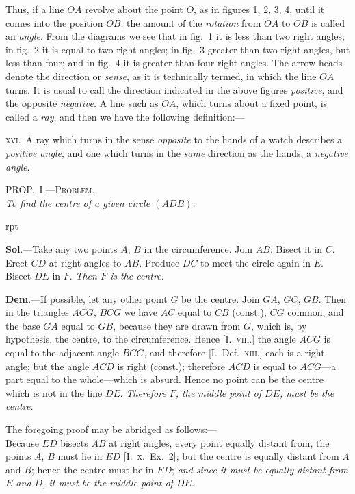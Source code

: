 \documentclass[oneside]{book}
\newcounter{wrapwidth}
\newcommand\myprop[2]{
\bigskip\Needspace*{4\baselineskip}\begin{center}\textsc{#1}\\\medskip\emph{#2}\par\end{center}
}
\newcommand\imgflow[3]{
\setcounter{wrapwidth}{#1}

\begin{wrapfigure}[#2]{r}{\value{wrapwidth}pt}
\begin{center}
\vspace{-0.3in}

\end{center}
\end{wrapfigure}
}
\newcommand\imgcent[2]{
\begin{center}

\end{center}
}
\begin{document}
\imgcent{308}{f103}

Thus, if a line $OA$ revolve about the point $O$, as in
figures 1, 2, 3, 4, until it comes into the position $OB$,
the amount of the \emph{rotation} from $OA$ to $OB$ is called an
\emph{angle}. From the diagrams we see that in fig.~1 it is
less than two right angles; in fig.~2 it is equal to two
right angles; in fig.~3 greater than two right angles,
but less than four; and in fig.~4 it is greater than four
right angles. The arrow-heads denote the direction or
\emph{sense}, as it is technically termed, in which the line $OA$
turns. It is usual to call the direction indicated in the
above figures \emph{positive}, and the opposite \emph{negative.} A line
such as $OA$, which turns about a fixed point, is called
a \emph{ray}, and then we have the following definition:---

\textsc{xvi}.\ A ray which turns in the sense \emph{opposite} to the
hands of a watch describes a \emph{positive angle}, and one
which turns in the \emph{same} direction as the hands, a
\emph{negative angle}.


\myprop{PROP\@.~I.---Problem.}{To find the centre of a given circle $(ADB)$.}


\imgflow{103}{9}{f104}

\textbf{Sol}.---Take any two points $A$, $B$ in the circumference.
Join $AB$. Bisect it in $C$. Erect
$CD$ at right angles to $AB$. Produce
$DC$ to meet the circle again in $E$.
Bisect $DE$ in $F$. \emph{Then $F$ is the
centre.}

\textbf{Dem}.---If possible, let any other
point $G$ be the centre. Join $GA$,
$GC$, $GB$. Then in the triangles
$ACG$, $BCG$ we have $AC$ equal to
$CB$ (const.), $CG$ common, and the
base $GA$ equal to $GB$, because they are drawn from $G$,
which is, by hypothesis, the centre, to the circumference.
Hence [I.\ \textsc{viii}.] the angle $ACG$ is equal to
the adjacent angle $BCG$, and therefore [I.\ Def.\ \textsc{xiii}.]
each is a right angle; but the angle $ACD$ is right
(const.); therefore $ACD$ is equal to $ACG$---a part equal
to the whole---which is absurd. Hence no point can
be the centre which is not in the line $DE$. \emph{Therefore $F$,
the middle point of $DE$, must be the centre.}

The foregoing proof may be abridged as follows:---\\
Because $ED$ bisects $AB$ at right angles, every point
equally distant from, the points $A$, $B$ must lie in $ED$
[I.\ \textsc{x.}\ Ex.\ 2]; but the centre is equally distant from
$A$ and $B$; hence the centre must be in $ED$; \emph{and since
it must be equally distant from $E$ and $D$, it must be the
middle point of $DE$.}
\end{document}
